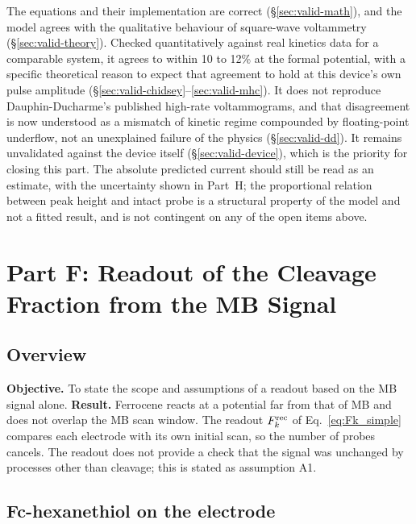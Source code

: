 \documentclass[10pt,a4paper]{article}
\numberwithin{equation}{section}
\newcommand{\Fkrec}{F_k^{\rm rec}}
\begin{document}
The equations and their implementation are correct (\S\ref{sec:valid-math}), and the model agrees with the
qualitative behaviour of square-wave voltammetry (\S\ref{sec:valid-theory}). Checked quantitatively against
real kinetics data for a comparable system, it agrees to within 10 to 12\% at the formal potential, with a
specific theoretical reason to expect that agreement to hold at this device's own pulse amplitude
(\S\ref{sec:valid-chidsey}--\ref{sec:valid-mhc}). It does not reproduce Dauphin-Ducharme's published
high-rate voltammograms, and that disagreement is now understood as a mismatch of kinetic regime compounded
by floating-point underflow, not an unexplained failure of the physics (\S\ref{sec:valid-dd}). It remains
unvalidated against the device itself (\S\ref{sec:valid-device}), which is the priority for closing this
part. The absolute predicted current should still be read as an estimate, with the uncertainty shown in
Part~H; the proportional relation between peak height and intact probe is a structural property of the
model and not a fitted result, and is not contingent on any of the open items above.

\section{Part F: Readout of the Cleavage Fraction from the MB Signal}
\label{sec:ratio}

\subsection{Overview}

\textbf{Objective.} To state the scope and assumptions of a readout based on the MB signal alone.
\textbf{Result.} Ferrocene reacts at a potential far from that of MB and does not overlap the MB scan
window. The readout $\Fkrec$ of Eq.~\eqref{eq:Fk_simple} compares each electrode with its own initial
scan, so the number of probes cancels. The readout does not provide a check that the signal was
unchanged by processes other than cleavage; this is stated as assumption A1.

\subsection{Fc-hexanethiol on the electrode}
\end{document}
